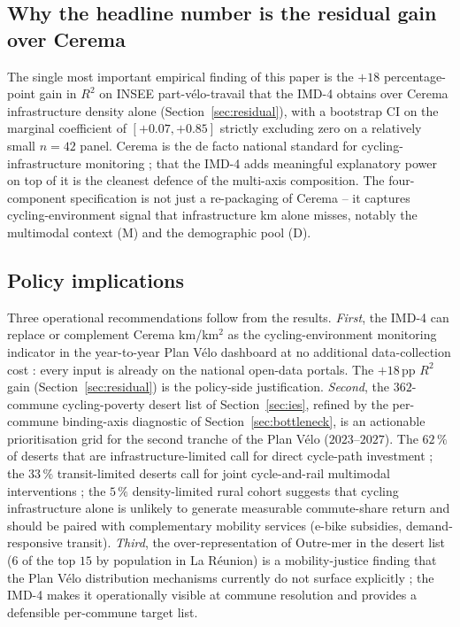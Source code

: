 \documentclass[11pt,a4paper]{article}
\begin{document}
\subsection{Why the headline number is the residual gain over Cerema}

The single most important empirical finding of this paper is the
$+18$ percentage-point gain in $R^2$ on INSEE part-v\'elo-travail
that the IMD-4 obtains over Cerema infrastructure density alone
(Section~\ref{sec:residual}), with a bootstrap CI on the marginal
coefficient of $[+0.07, +0.85]$ strictly excluding zero on a
relatively small $n = 42$ panel.  Cerema is the de facto national
standard for cycling-infrastructure monitoring ; that the IMD-4
adds meaningful explanatory power on top of it is the cleanest
defence of the multi-axis composition.  The four-component
specification is not just a re-packaging of Cerema -- it captures
cycling-environment signal that infrastructure km alone misses,
notably the multimodal context (M) and the demographic pool (D).

\subsection{Policy implications}
\label{sec:policy}

Three operational recommendations follow from the results.
\emph{First}, the IMD-4 can replace or complement Cerema km/km$^2$
as the cycling-environment monitoring indicator in the
year-to-year Plan V\'elo \citep{PlanVelo2018} dashboard at no
additional data-collection cost : every input is already on the
national open-data portals.  The $+18$\,pp $R^2$ gain
(Section~\ref{sec:residual}) is the policy-side justification.
\emph{Second}, the $362$-commune cycling-poverty desert list of
Section~\ref{sec:ies}, refined by the per-commune binding-axis
diagnostic of Section~\ref{sec:bottleneck}, is an actionable
prioritisation grid for the second tranche of the Plan V\'elo
($2023$--$2027$).  The $62\,\%$ of deserts that are
infrastructure-limited call for direct cycle-path investment ;
the $33\,\%$ transit-limited deserts call for joint cycle-and-rail
multimodal interventions ; the $5\,\%$ density-limited rural
cohort suggests that cycling infrastructure alone is unlikely to
generate measurable commute-share return and should be paired with
complementary mobility services (e-bike subsidies, demand-
responsive transit).
\emph{Third}, the over-representation of Outre-mer in the desert
list ($6$ of the top $15$ by population in La R\'eunion) is a
mobility-justice finding that the Plan V\'elo distribution
mechanisms currently do not surface explicitly ; the IMD-4 makes
it operationally visible at commune resolution and provides a
defensible per-commune target list.
\end{document}
